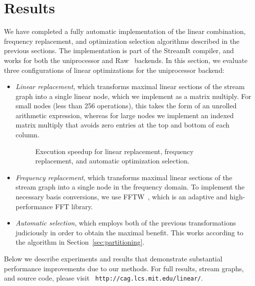 \section{Results}
\label{sec:results}

We have completed a fully automatic implementation of the linear
combination, frequency replacement, and optimization selection
algorithms described in the previous sections.  The implementation is
part of the StreamIt compiler, and works for both the uniprocessor and
Raw~\cite{raw-micro} backends.  In this section, we evaluate three
configurations of linear optimizations for the uniprocessor backend:
\begin{itemize}

\item {\it Linear replacement}, which transforms maximal linear
sections of the stream graph into a single linear node, which we
implement as a matrix multiply.  For small nodes (less than 256
operations), this takes the form of an unrolled arithmetic expression,
whereas for large nodes we implement an indexed matrix multiply that
avoids zero entries at the top and bottom of each column.

\begin{figure}[t]
\vspace{-16pt}
\vspace{-16pt}
\caption{Execution speedup for linear replacement, frequency replacement, and automatic optimization selection.}
\label{fig:execution-speedup}
\vspace{-6pt}
\end{figure}

\item {\it Frequency replacement}, which transforms maximal linear
sections of the stream graph into a single node in the frequency
domain.  To implement the necessary basis conversions, we use
FFTW~\cite{frigo99fast}, which is an adaptive and high-performance FFT
library.

\item {\it Automatic selection}, which employs both of the previous
transformations judiciously in order to obtain the maximal benefit.
This works according to the algorithm in
Section~\ref{sec:partitioning}.
\end{itemize}
Below we describe experiments and results that demonstrate substantial
performance improvements due to our methods.  For full results, stream
graphs, and source code, please visit {\tt
http://cag.lcs.mit.edu/linear/}.

